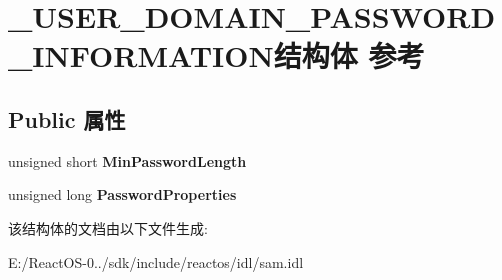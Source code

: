 \hypertarget{struct___u_s_e_r___d_o_m_a_i_n___p_a_s_s_w_o_r_d___i_n_f_o_r_m_a_t_i_o_n}{}\section{\+\_\+\+U\+S\+E\+R\+\_\+\+D\+O\+M\+A\+I\+N\+\_\+\+P\+A\+S\+S\+W\+O\+R\+D\+\_\+\+I\+N\+F\+O\+R\+M\+A\+T\+I\+O\+N结构体 参考}
\label{struct___u_s_e_r___d_o_m_a_i_n___p_a_s_s_w_o_r_d___i_n_f_o_r_m_a_t_i_o_n}
\subsection*{Public 属性}
\begin{DoxyCompactItemize}
\item 
\mbox{\label{struct___u_s_e_r___d_o_m_a_i_n___p_a_s_s_w_o_r_d___i_n_f_o_r_m_a_t_i_o_n_a08a1074c7467ffc31496c9a15dd546d3}} 
unsigned short {\bfseries Min\+Password\+Length}
\item 
\mbox{\label{struct___u_s_e_r___d_o_m_a_i_n___p_a_s_s_w_o_r_d___i_n_f_o_r_m_a_t_i_o_n_a85316361c6f5b3cc418f82aa184d9c6e}} 
unsigned long {\bfseries Password\+Properties}
\end{DoxyCompactItemize}


该结构体的文档由以下文件生成\+:\begin{DoxyCompactItemize}
\item 
E\+:/\+React\+O\+S-\/0../sdk/include/reactos/idl/sam.\+idl\end{DoxyCompactItemize}

